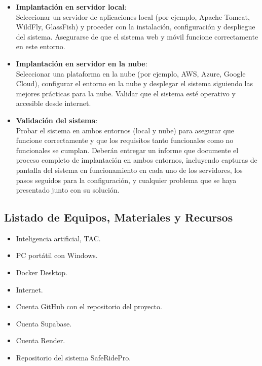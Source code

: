 \documentclass{article}
\begin{document}
\begin{itemize}
    \item \textbf{Implantación en servidor local}: \\ Seleccionar un servidor de aplicaciones local (por ejemplo, Apache Tomcat, WildFly, GlassFish) y proceder con la instalación, configuración y despliegue del sistema. Asegurarse de que el sistema web y móvil funcione correctamente en este entorno.
    
    \item \textbf{Implantación en servidor en la nube}: \\ Seleccionar una plataforma en la nube (por ejemplo, AWS, Azure, Google Cloud), configurar el entorno en la nube y desplegar el sistema siguiendo las mejores prácticas para la nube. Validar que el sistema esté operativo y accesible desde internet.
    
    \item \textbf{Validación del sistema}:\\ Probar el sistema en ambos entornos (local y nube) para asegurar que funcione correctamente y que los requisitos tanto funcionales como no funcionales se cumplan. Deberán entregar un informe que documente el proceso completo de implantación en ambos entornos, incluyendo capturas de pantalla del sistema en funcionamiento en cada uno de los servidores, los pasos seguidos para la configuración, y cualquier problema que se haya presentado junto con su solución.
\end{itemize}

\subsection{Listado de Equipos, Materiales y Recursos}
\begin{itemize}
    \item Inteligencia artificial, TAC.
    \item PC portátil con Windows.
    \item Docker Desktop.
    \item Internet.
    \item Cuenta GitHub con el repositorio del proyecto.
    \item Cuenta Supabase.
    \item Cuenta Render.
    \item Repositorio del sistema SafeRidePro.
\end{itemize}
\end{document}
